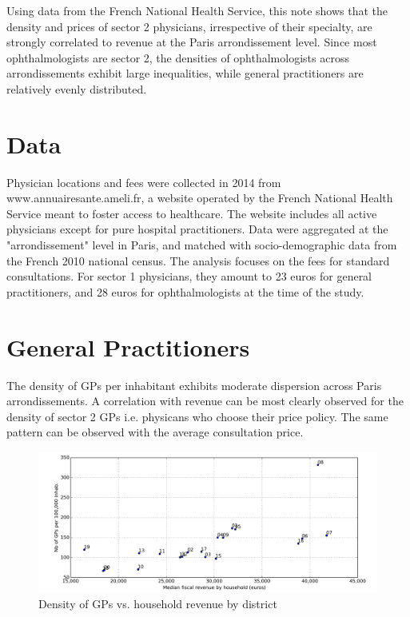 \documentclass[11pt]{article}
\begin{document}
Using data from the French National Health Service, this note shows that the density and prices of sector 2 physicians, irrespective of their specialty, are strongly correlated to revenue at the Paris arrondissement level. Since most ophthalmologists are sector 2, the densities of ophthalmologists across arrondissements exhibit large inequalities, while general practitioners are relatively evenly distributed.

\section{Data}

Physician locations and fees were collected in 2014 from www.annuairesante.ameli.fr, a website operated by the French National Health Service meant to foster access to healthcare. The website includes all active physicians except for pure hospital practitioners. Data were aggregated at the "arrondissement" level in Paris, and matched with socio-demographic data from the French 2010 national census. The analysis focuses on the fees for standard consultations. For sector 1 physicians, they amount to 23 euros for general practitioners, and 28 euros for ophthalmologists at the time of the study.

\section{General Practitioners}

The density of GPs per inhabitant exhibits moderate dispersion across Paris arrondissements. A correlation with revenue can be most clearly observed for the density of sector 2 GPs i.e. physicans who choose their price policy. The same pattern can be observed with the average consultation price.

\begin{figure}[H]
    \caption{Density of GPs vs. household revenue by district}
	\centering
		\includegraphics[width=16cm]{images/GP_Ardt_DensityVsRevenue.png}
\end{figure}
\end{document}
